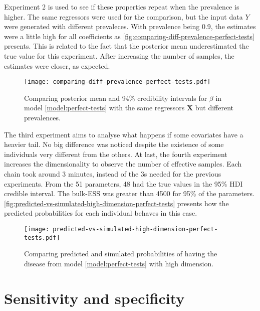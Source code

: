 Experiment 2 is used to see if these properties repeat when the prevalence is
higher. The same regressors were used for the comparison, but the input data
$Y$ were generated with different prevaleces. With prevalence being 0.9, the
estimates were a little high for all coefficients as
\autoref{fig:comparing-diff-prevalence-perfect-tests} presents. This is
related to the fact that the posterior mean underestimated the true value for this
experiment. After increasing the number of samples, the estimates were closer,
as expected.

\begin{figure}[!ht]
  \centering
  \caption{\label{fig:comparing-diff-prevalence-perfect-tests}Comparing
    posterior mean and 94\% credibility intervals for $\beta$ in model \eqref{model:perfect-tests} with the same regressors
    $\boldsymbol{X}$ but different prevalences.}
  \texttt{[image: comparing-diff-prevalence-perfect-tests.pdf]}
\end{figure}

The third experiment aims to analyse what happens if some covariates have a
heavier tail. No big difference was noticed despite the existence of some
individuals very different from the others. At last, the fourth experiment
increases the dimensionality to observe the number of effective samples. Each
chain took around 3 minutes, instead of the 3s needed for the previous
experiments. From the 51 parameters, 48 had the true values in the 95\% HDI
credible interval. The bulk-ESS was greater than 4500 for 95\% of the
parameters. \autoref{fig:predicted-vs-simulated-high-dimension-perfect-tests}
presents how the predicted probabilities for each individual behaves in this
case.

\begin{figure}[!hb]
  \centering
  \caption{\label{fig:predicted-vs-simulated-high-dimension-perfect-tests}
    Comparing predicted and simulated probabilities of having the disease from
    model \eqref{model:perfect-tests} with high dimension.}
  \texttt{[image: predicted-vs-simulated-high-dimension-perfect-tests.pdf]}
\end{figure}

\section{Sensitivity and specificity}

